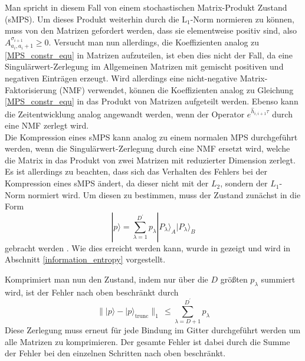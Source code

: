 \documentclass[10pt,a4paper]{report}
\begin{document}
Man spricht in diesem Fall von einem stochastischen Matrix-Produkt Zustand (sMPS). Um dieses Produkt weiterhin durch die $\text{L}_1$-Norm normieren zu können, muss von den Matrizen gefordert werden, dass sie elementweise positiv sind, also $A_{a_i,a_i+1}^{\sigma_{i+1}}\geq 0$. 
Versucht man nun allerdings, die Koeffizienten analog zu \ref{MPS_constr_equ} in Matrizen aufzuteilen, ist eben dies nicht der Fall, da eine Singulärwert-Zerlegung im Allgemeinen Matrizen mit gemischt positiven und negativen Einträgen erzeugt. Wird allerdings eine nicht-negative Matrix-Faktorisierung (NMF) verwendet, können die Koeffizienten analog zu Gleichung \ref{MPS_constr_equ} in das Produkt von Matrizen aufgeteilt werden. Ebenso kann die Zeitentwicklung analog angewandt werden, wenn der Operator $e^{\hat{h}_{i,i+1}\tau}$ durch eine NMF zerlegt wird.\\


Die Kompression eines sMPS kann analog zu einem normalen MPS durchgeführt werden, wenn die Singulärwert-Zerlegung durch eine NMF ersetzt wird, welche die Matrix in das Produkt von zwei Matrizen mit reduzierter Dimension zerlegt. Es ist allerdings zu beachten, dass sich das Verhalten des Fehlers bei der Kompression eines sMPS ändert, da dieser nicht mit der $L_2$, sondern der $L_1$-Norm normiert wird. Um diesen zu bestimmen, muss der Zustand zunächst in die Form
\begin{equation}
|p\rangle=\sum_{\lambda=1}^{D^{\prime}}p_{\lambda}|P_{\lambda}\rangle_A|P_{\lambda}\rangle_B
\end{equation}
gebracht werden \cite{MPS-vs-sMPS}. Wie dies erreicht werden kann, wurde in \cite{sMPS} gezeigt und wird in Abschnitt \ref{information_entropy} vorgestellt.

Komprimiert man nun den Zustand, indem nur über die $D$ größten $p_{\lambda}$ summiert wird, ist der Fehler nach oben beschränkt durch
\begin{equation}
\lVert|p\rangle-|p\rangle_{\text{trunc}}\rVert_1\,\leq\sum_{\lambda=D+1}^{D^{\prime}}p_{\lambda}
\end{equation}
Diese Zerlegung muss erneut für jede Bindung im Gitter durchgeführt werden um alle Matrizen zu komprimieren. Der gesamte Fehler ist dabei durch die Summe der Fehler bei den einzelnen Schritten nach oben beschränkt.\\
\end{document}
